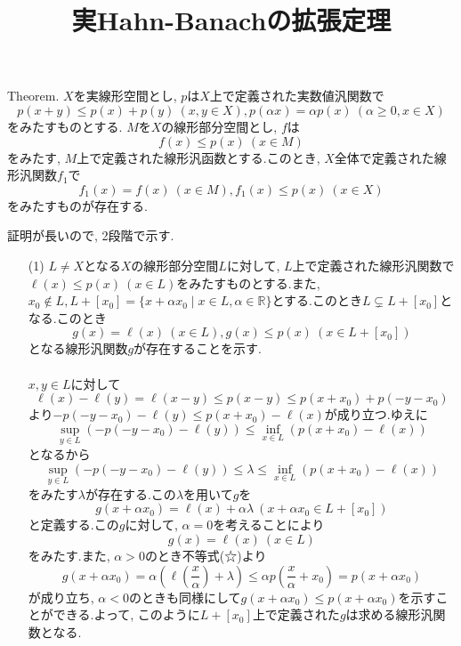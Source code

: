 \documentclass[a4j,dvipdfmx]{jarticle}
\title{実Hahn-Banachの拡張定理}
\date{}
\author{}
\begin{document}
\maketitle
\thispagestyle{empty}
\begin{description}
\begin{framed}
\item[Theorem.] $X$を実線形空間とし, $p$は$X$上で定義された実数値汎関数で
\[ p(x+y)\leq p(x)+p(y) \ (x,y\in X), p(\alpha x)=\alpha p(x) \ (\alpha\geq 0,x\in X) \]
をみたすものとする. $M$を$X$の線形部分空間とし, $f$は
\[ f(x)\leq p(x) \ (x\in M) \]
をみたす, $M$上で定義された線形汎函数とする.このとき, $X$全体で定義された線形汎関数$f_1$で
\[ f_1(x)=f(x) \ (x\in M), f_1(x)\leq p(x) \ (x\in X) \]
をみたすものが存在する.
\end{framed}

\item[Proof.] 証明が長いので, 2段階で示す.
\begin{enumerate}
\item[(1)] $L\neq X$となる$X$の線形部分空間$L$に対して, $L$上で定義された線形汎関数で$\ell(x)\leq p(x) \ (x\in L)$をみたすものとする.また, $x_0\notin L, L+[x_0]=\{x+\alpha x_0 \mid x\in L,\alpha\in\mathbb{R}\}$とする.このとき$L\subsetneq L+[x_0]$となる.このとき
\[ g(x)=\ell(x) \ (x\in L), g(x)\leq p(x) \ (x\in L+[x_0]) \]
となる線形汎関数$g$が存在することを示す. \\ \ \\
$x,y\in L$に対して
\[ \ell(x)-\ell(y)=\ell(x-y)\leq p(x-y)\leq p(x+x_0)+p(-y-x_0) \]
より$-p(-y-x_0)-\ell(y)\leq p(x+x_0)-\ell(x)$が成り立つ.ゆえに
\[ \sup_{y\in L}\left(-p(-y-x_0)-\ell(y)\right)\leq\inf_{x\in L}\left(p(x+x_0)-\ell(x)\right) \]
となるから
\[ \sup_{y\in L}\left(-p(-y-x_0)-\ell(y)\right)\leq\lambda\leq\inf_{x\in L}\left(p(x+x_0)-\ell(x)\right) \tag{☆}\]
をみたす$\lambda$が存在する.この$\lambda$を用いて$g$を
\[ g(x+\alpha x_0)=\ell(x)+\alpha\lambda \ (x+\alpha x_0\in L+[x_0])\]
と定義する.この$g$に対して, $\alpha=0$を考えることにより
\[ g(x)=\ell(x) \ (x\in L) \]
をみたす.また, $\alpha>0$のとき不等式(☆)より
\[ g(x+\alpha x_0)=\alpha\left(\ell\left(\frac{x}{\alpha}\right)+\lambda\right)\leq \alpha p\left(\frac{x}{\alpha}+x_0\right)=p(x+\alpha x_0) \]
が成り立ち, $\alpha<0$のときも同様にして$g(x+\alpha x_0)\leq p(x+\alpha x_0)$を示すことができる.よって, このように$L+[x_0]$上で定義された$g$は求める線形汎関数となる.


\end{enumerate}
\end{description}
\end{document}

